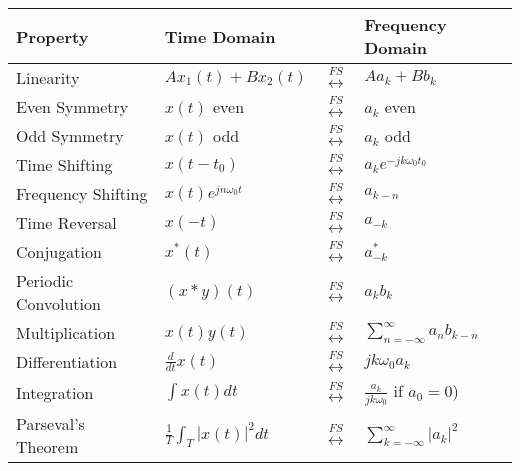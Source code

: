 \begin{table}[ht]
    \centering
    \label{tab:ctfourier_properties}
    \begin{tabular}{llll}
        \toprule
        \textbf{Property}    & \textbf{Time Domain}             &                                 & \textbf{Frequency Domain}                 \\
        \midrule
        Linearity            & $A x_1(t) + B x_2(t)$            & $\overset{FS}{\leftrightarrow}$ & $A a_k + B b_k$                           \\
        Even Symmetry        & $x(t)$ even                      & $\overset{FS}{\leftrightarrow}$ & $a_k$ even                                \\
        Odd Symmetry         & $x(t)$ odd                       & $\overset{FS}{\leftrightarrow}$ & $a_k$ odd                                 \\
        Time Shifting        & $x(t - t_0)$                     & $\overset{FS}{\leftrightarrow}$ & $a_k e^{-j k \omega_0 t_0}$               \\
        Frequency Shifting   & $x(t) e^{j n \omega_0 t}$        & $\overset{FS}{\leftrightarrow}$ & $a_{k - n}$                               \\
        Time Reversal        & $x(-t)$                          & $\overset{FS}{\leftrightarrow}$ & $a_{-k}$                                  \\
        Conjugation          & $x^*(t)$                         & $\overset{FS}{\leftrightarrow}$ & $a_{-k}^*$                                \\
        Periodic Convolution & $(x \ast y)(t)$                  & $\overset{FS}{\leftrightarrow}$ & $a_k b_k$                                 \\
        Multiplication       & $x(t) y(t)$                      & $\overset{FS}{\leftrightarrow}$ & $\sum_{n=-\infty}^{\infty} a_n b_{k - n}$ \\
        Differentiation      & $\frac{d}{dt} x(t)$              & $\overset{FS}{\leftrightarrow}$ & $j k \omega_0 a_k$                        \\
        Integration          & $\int x(t) dt$                   & $\overset{FS}{\leftrightarrow}$ & $\frac{a_k}{j k \omega_0}$ if $a_0 = 0$)  \\
        Parseval's Theorem   & $\frac{1}{T} \int_T |x(t)|^2 dt$ & $\overset{FS}{\leftrightarrow}$ & $\sum_{k=-\infty}^{\infty} |a_k|^2$       \\
        \bottomrule
    \end{tabular}
\end{table}

